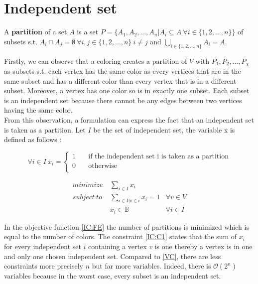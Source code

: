 \section{Independent set}
\label{IC}

\begin{mydef}
A \textbf{partition} of a set $A$ is a set $P=\{A_1,A_2,\dots,A_n | A_i \subseteq A\ \forall i \in \{1,2,\dots,n\} \}$ of subsets s.t. $A_i \cap A_j = \emptyset\ \forall i,j \in\{1,2,\dots,n\}\ i \neq j $ and $\bigcup_{i \in \{1,2,\dots,n\}} A_i = A$.
\end{mydef}

Firstly, we can observe that a coloring creates a partition of $V$ with $P_1,P_2,\dots,P_{\chi}$ as subsets s.t. each vertex has the same color as every vertices that are in the same subset and has a different color than every vertex that is in a different subset. Moreover, a vertex has one color so is in exactly one subset. Each subset is an independent set because there cannot be any edges between two vertices having the same color. \\

From this observation, a formulation can express the fact that an independent set is taken as a partition. Let $I$ be the set of independent set, the variable x is defined as follows :

\[ \forall i \in I\ x_{i} =
  \begin{cases}
    1       & \quad \text{if the independent set i is taken as a partition}  \\
    0  		& \quad \text{otherwise }\\
  \end{cases}
\]

\begin{eqnarray}
minimize\ &  \displaystyle\sum_{i \in I} x_i & \label{IC:FE}\\
subject\ to &   \displaystyle\sum_{i \in I | v \in i}{x_{i}} = 1   & \forall v \in V  \label{IC:C1}\\
&  x_{i} \in \mathbb{B} &  \forall i \in I
\end{eqnarray}

In the objective function \ref{IC:FE} the number of partitions is minimized which is equal to the number of colors. The constraint \ref{IC:C1} states that the sum of $x_i$ for every independent set $i$ containing a vertex $v$ is one thereby a vertex is in one and only one chosen independent set. Compared to \ref{VC}, there are less constraints more precisely $n$ but far more variables. Indeed, there is $\mathcal{O}(2^n)$ variables because in the worst case, every subset is an independent set. \\

